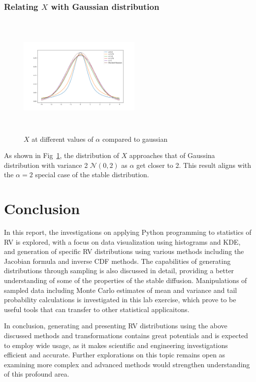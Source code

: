 \documentclass[11pt, twocolumn]{article}
\begin{document}
\subsubsection{Relating $X$ with Gaussian distribution}
\begin{figure}[h]
    \centering
    \includegraphics[width=0.53\textwidth, height=6cm]{q4_3}
    \caption{$X$ at different values of $\alpha$ compared to gaussian}
    \label{fig:q4_3}
\end{figure}

As shown in Fig~\ref{fig:q4_3}, the distribution of $X$ approaches that of Gaussina distribution with variance 2 $\mathcal{N}(0,2)$ as $\alpha$ get closer to 2.
This result aligns with the $\alpha =2$ special case of the stable distribution.

\section{Conclusion}
In this report, the investigations on applying Python programming to statistics of RV is explored, with a focus on data visualization using histograms and KDE, and generation of specific RV distributions using various methods including the Jacobian formula and inverse CDF methods. 
The capabilities of generating distributions through sampling is also discussed in detail, providing a better understanding of some of the properties of the stable diffusion.
Manipulations of sampled data including Monte Carlo estimates of mean and variance and tail probability calculations is investigated in this lab exercise, which prove to be useful tools that can transfer to other statistical applicaitons.

In conclusion, generating and presenting RV distributions using the above discussed methods and transformations contains great potentials and is expected to employ wide usage, as it makes scientific and engineering investigations efficient and accurate. Further explorations on this topic remains open as examining more complex and advanced methods would strengthen understanding of this profound area.
\end{document}
